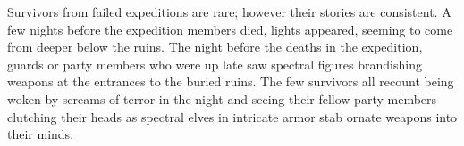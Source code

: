 Survivors from failed expeditions are rare; however their stories are consistent.
A few nights before the expedition members died, lights appeared, seeming to come from deeper below the ruins.
The night before the deaths in the expedition, guards or party members who were up late saw spectral figures brandishing weapons at the entrances to the buried ruins.
The few survivors all recount being woken by screams of terror in the night and seeing their fellow party members clutching their heads as spectral elves in intricate armor stab ornate weapons into their minds.
